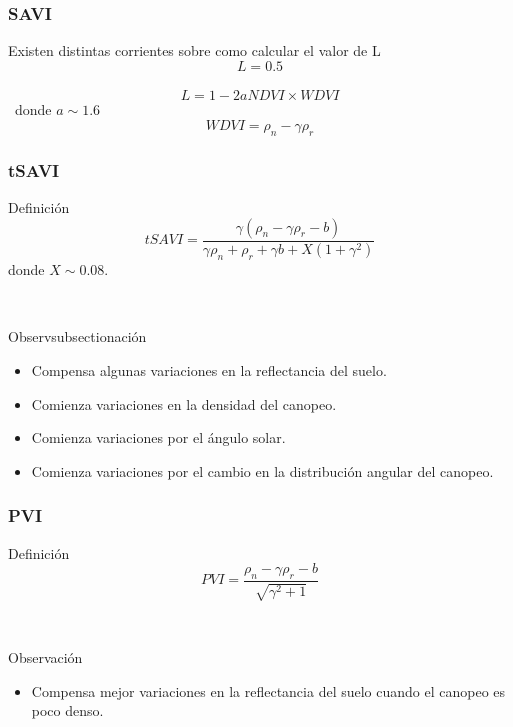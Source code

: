 \documentclass[handout]{beamer}
\begin{document}
\begin{frame}
    \frametitle{SAVI}
    Existen distintas corrientes sobre como calcular el valor de L
    \begin{equation}
        L=0.5
    \end{equation}\pause\
    \begin{equation}
        L = 1-2 a NDVI \times WDVI
    \end{equation}\pause\
    donde $a\sim 1.6$
    \begin{equation}
        WDVI = \rho_n -\gamma \rho_r
    \end{equation}
\end{frame}

\begin{frame}
    \frametitle{tSAVI}
    \begin{block}{Definición}
        \begin{equation}
            tSAVI =
            \frac{\gamma(\rho_n-\gamma\rho_r-b)}{\gamma\rho_n+\rho_r+\gamma b
            +X(1+\gamma^2)}
        \end{equation}
        donde $X\sim0.08$.
    \end{block}\pause\
    \begin{block}{Observsubsectionación}
        \begin{itemize}[<+->]
            \item Compensa algunas variaciones en la reflectancia del suelo.
            \item Comienza variaciones en la densidad del canopeo.
            \item Comienza variaciones por el ángulo solar.
            \item Comienza variaciones por el cambio en la distribución
                angular del canopeo.
        \end{itemize}
    \end{block}
\end{frame}

\begin{frame}
    \frametitle{PVI}
    \begin{block}{Definición}
        \begin{equation}
            PVI = \frac{\rho_n-\gamma\rho_r-b}{\sqrt{\gamma^2+1}}
        \end{equation}
    \end{block}\pause\
    \begin{block}{Observación}
        \begin{itemize}
            \item Compensa mejor variaciones en la reflectancia del suelo cuando
                el canopeo es poco denso.
        \end{itemize}
    \end{block}
\end{frame}
\end{document}
